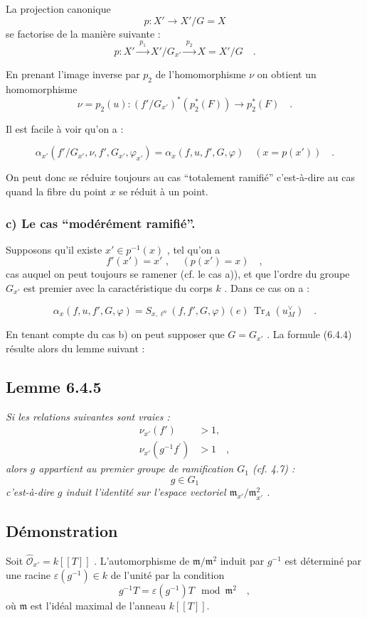 \documentclass[11pt]{article}
\providecommand{\fm}{\mathfrak{m}}
\providecommand{\Tr}{\operatorname{Tr}}
\providecommand{\Tr}{\operatorname{Tr}}
\providecommand{\Tr}{\operatorname{Tr}}
\providecommand{\Tr}{\operatorname{Tr}}
\providecommand{\fm}{\mathfrak m}
\providecommand{\Tr}{\operatorname{Tr}}
\begin{document}
La projection canonique
\[
p : X' \longrightarrow X'/G = X
\]
se factorise de la manière suivante :
\[
p : X' \xrightarrow{\;p_1\;} X'/G_{x'} \xrightarrow{\;p_2\;} X = X'/G \quad .
\]

En prenant l'image inverse par $p_2$ de l'homomorphisme $\nu$ on obtient un homomorphisme
\[
\nu = p_2(u) : (f'/G_{x'})^*(p_2^*(F)) \longrightarrow p_2^*(F) \quad .
\]

Il est facile à voir qu'on a :

\begin{equation}\tag{6.4.3}
\alpha_{x'}(f'/G_{x'}, \nu, f', G_{x'}, \varphi_{x'}) = \alpha_x(f,u, f', G, \varphi) \quad (x = p(x')) \quad .
\end{equation}

On peut donc se réduire toujours au cas ``totalement ramifié'' c'est-à-dire au cas quand la fibre du point $x$ se réduit à un point.

\subsubsection*{c) Le cas ``modérément ramifié''.} Supposons qu'il existe $x' \in p^{-1}(x)$ , tel qu'on a
\[
f'(x') = x' \text{ , } \quad (p(x') = x) \quad ,
\]
cas auquel on peut toujours se ramener (cf. le cas a)), et que l'ordre du groupe $G_{x'}$ est premier avec la caractéristique du corps $k$ . Dans ce cas on a :

\begin{equation}\tag{6.4.4}
\alpha_x(f,u, f', G, \varphi) = S_{x,\ell^n}(f, f', G, \varphi)(e) \, \Tr_A(u_M^\vee) \quad .
\end{equation}

En tenant compte du cas b) on peut supposer que $G = G_{x'}$ . La formule (6.4.4) résulte alors du lemme suivant :

\subsection*{Lemme 6.4.5}
\emph{Si les relations suivantes sont vraies :}
\begin{align*}
\nu_{x'}(f') &> 1 \text{,} \\
\nu_{x'}(g^{-1}f^{\prime}) &> 1 \quad ,
\end{align*}
\emph{alors $g$ appartient au premier groupe de ramification $G_1$ (cf. 4.7) :}
\[
g \in G_1
\]
\emph{c'est-à-dire $g$ induit l'identité sur l'espace vectoriel $\fm_{x'}/\fm_{x'}^2$ .}

\subsection*{Démonstration}
Soit $\widehat{\mathcal{O}}_{x'} = k[[T]]$ . L'automorphisme de $\fm/\fm^2$ induit par $g^{-1}$ est déterminé par une racine $\varepsilon(g^{-1}) \in k$ de l'unité par la condition
\[
g^{-1}T = \varepsilon(g^{-1})T \mod \fm^2 \quad ,
\]
où $\fm$ est l'idéal maximal de l'anneau $k[[T]]$.
\end{document}
